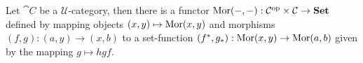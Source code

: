 

\begin{definition}
\label{def:two-sided-represented-functor}
Let \(\cat C\) be a \(\mathcal U\)-category, then there is a functor
\(\operatorname{Mor}(-, -): \mathcal C^{\mathrm{op}} \times \mathcal C \to {\textbf{Set}}\) defined by mapping objects
\((x, y) \mapsto \operatorname{Mor}(x, y)\) and morphisms \((f, g): (a, y) \to (x, b)\) to a
set-function \((f^{*}, g_{*}): \operatorname{Mor}(x, y) \to \operatorname{Mor}(a, b)\) given by the mapping
\(g \mapsto h g f\).
\end{definition}
